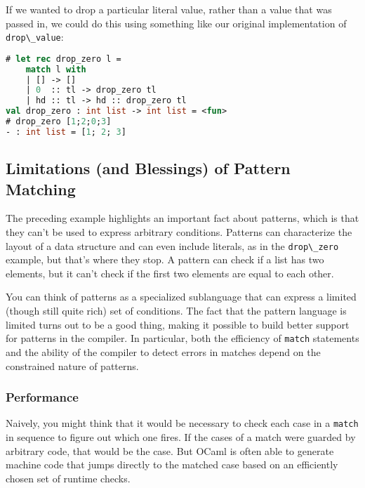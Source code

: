 If we wanted to drop a particular literal value, rather than a value
that was passed in, we could do this using something like our original
implementation of \passthrough{\lstinline!drop\_value!}:

\begin{lstlisting}[language=Caml]
# let rec drop_zero l =
    match l with
    | [] -> []
    | 0  :: tl -> drop_zero tl
    | hd :: tl -> hd :: drop_zero tl
val drop_zero : int list -> int list = <fun>
# drop_zero [1;2;0;3]
- : int list = [1; 2; 3]
\end{lstlisting}

\hypertarget{limitations-and-blessings-of-pattern-matching}{%
\subsection{Limitations (and Blessings) of Pattern
Matching}\label{limitations-and-blessings-of-pattern-matching}}

The preceding example highlights an important fact about patterns, which
is that they can't be used to express arbitrary conditions. Patterns can
characterize the layout of a data structure and can even include
literals, as in the \passthrough{\lstinline!drop\_zero!} example, but
that's where they stop. A pattern can check if a list has two elements,
but it can't check if the first two elements are equal to each
other.

You can think of patterns as a specialized sublanguage that can express
a limited (though still quite rich) set of conditions. The fact that the
pattern language is limited turns out to be a good thing, making it
possible to build better support for patterns in the compiler. In
particular, both the efficiency of \passthrough{\lstinline!match!}
statements and the ability of the compiler to detect errors in matches
depend on the constrained nature of patterns.

\hypertarget{performance}{%
\subsubsection{Performance}\label{performance}}

Naively, you might think that it would be necessary to check each case
in a \passthrough{\lstinline!match!} in sequence to figure out which one
fires. If the cases of a match were guarded by arbitrary code, that
would be the case. But OCaml is often able to generate machine code that
jumps directly to the matched case based on an efficiently chosen set of
runtime checks.

